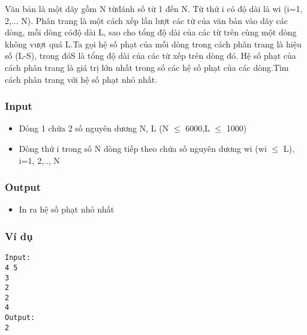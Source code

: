 



   Văn bản là một dãy gồm N từđánh số từ 1 đến N. Từ thứ i có độ dài là wi (i=1, 2,... N). Phân trang là một cách xếp lần lượt các từ của văn bản vào dãy các dòng, mỗi dòng cóđộ dài L, sao cho tổng độ dài của các từ trên cùng một dòng không vượt quá L.Ta gọi hệ số phạt của mỗi dòng trong cách phân trang là hiệu số (L-S), trong đóS là tổng độ dài của các từ xếp trên dòng đó. Hệ số phạt của cách phân trang là giá trị lớn nhất trong số các hệ số phạt của các dòng.Tìm cách phân trang với hệ số phạt nhỏ nhất.  

\subsubsection{   Input  }
\begin{itemize}
	\item     Dòng 1 chứa 2 số nguyên dương N, L (N $\le$ 6000,L $\le$ 1000)   
	\item     Dòng thứ i trong số N dòng tiếp theo chứa số nguyên dương wi (wi $\le$ L), i=1, 2,.., N   
\end{itemize}

\subsubsection{   Output  }
\begin{itemize}
	\item     In ra hệ số phạt nhỏ nhất   
\end{itemize}

\subsubsection{   Ví dụ  }
\begin{verbatim}
Input:
4 5
3
2
2
4
Output:
2 
\end{verbatim}
